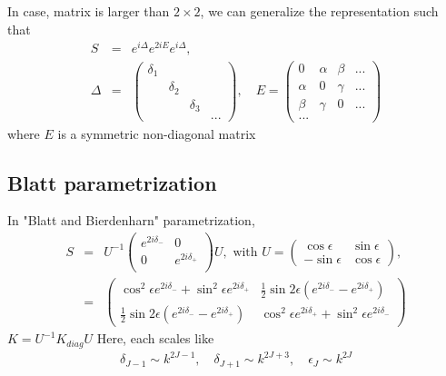 \documentclass[10pt]{book}
\newcommand{\bea}{\begin{eqnarray}}
\newcommand{\eea}{\end{eqnarray}}
\newcommand{\no}{\nonumber \\}
\begin{document}
In case, matrix is larger than $2\times 2$, we can generalize the
representation such that
\bea
S&=&e^{i \Delta}e^{2i E} e^{i\Delta},\no
\Delta&=&\left(\begin{array}{cccc} \delta_1 &  &  &  \\
                                     &\delta_2 & &\\
                                     &  & \delta_3 & \\
                                     &  &  & ...   
\end{array}
\right),\quad
E=\left(\begin{array}{cccc} 
  0 & \alpha & \beta & ... \\
  \alpha & 0 & \gamma & ...\\
  \beta & \gamma & 0 & ... \\
  ... &  &  &  
  \end{array}
\right)
\eea
where $E$ is a symmetric non-diagonal matrix

\subsection{Blatt parametrization}
In "Blatt and Bierdenharn" parametrization,
\bea
S&=&U^{-1}\left(\begin{array}{cc}
   e^{2i\delta_-} & 0 \\ 0 & e^{2i\delta_+}\\
\end{array}\right)U, \mbox{ with }
 U=\left(\begin{array}{cc}
    \cos\epsilon &\sin\epsilon \\ -\sin\epsilon & \cos\epsilon
 \end{array}\right),\no
 &=&\left(\begin{array}{cc}
  \cos^2\epsilon e^{2i\delta_{-}} +\sin^2\epsilon e^{2i\delta_{+}} &
  \frac{1}{2}\sin2\epsilon (e^{2i\delta_-}-e^{2i\delta_+}) \\
  \frac{1}{2}\sin2\epsilon (e^{2i\delta_-}-e^{2i\delta_+}) &
  \cos^2\epsilon e^{2i\delta_{+}} +\sin^2\epsilon e^{2i\delta_{-}}
 \end{array}\right)
\eea
$K=U^{-1}K_{diag} U$
Here, each scales like 
\bea
{\delta}_{J-1}\sim k^{2J-1},\quad
{\delta}_{J+1}\sim k^{2J+3},\quad
{\epsilon}_J\sim k^{2J}
\eea
\end{document}
